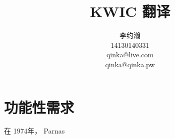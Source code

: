 \documentclass{ctexart}
\author{李约瀚 \\ 14130140331 \\ qinka@live.com \\ qinka@qinka.pw}
\title{KWIC 翻译}
\begin{document}
\maketitle

\section{功能性需求}

在 1974年， Parnas
\end{document}
